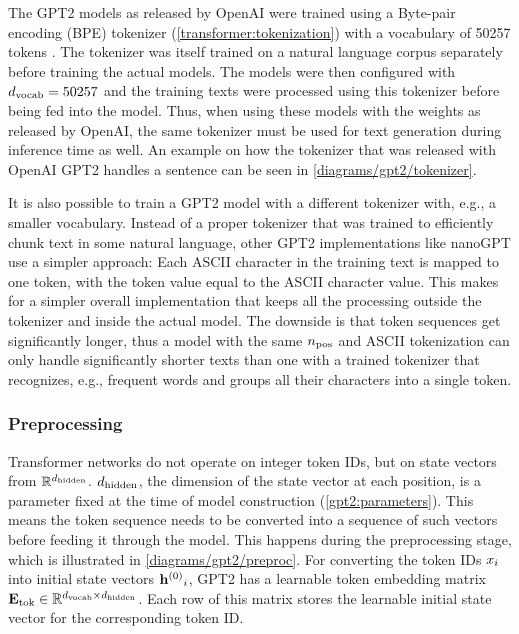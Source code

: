 \label{gpt2:tokenizer}

The GPT2 models as released by OpenAI were trained using a Byte-pair encoding (BPE) tokenizer (\cref{transformer:tokenization}) with a vocabulary of 50257 tokens  \cite{HuggingFaceGPT2}. The tokenizer was itself trained on a natural language corpus separately before training the actual models. The models were then configured with ${d_\textrm{vocab}}=50257$ and the training texts were processed using this tokenizer before being fed into the model. Thus, when using these models with the weights as released by OpenAI, the same tokenizer must be used for text generation during inference time as well. An example on how the tokenizer that was released with OpenAI GPT2 handles a sentence can be seen in \cref{diagrams/gpt2/tokenizer}.

It is also possible to train a GPT2 model with a different tokenizer with, e.g., a smaller vocabulary. Instead of a proper tokenizer that was trained to efficiently chunk text in some natural language, other GPT2 implementations like nanoGPT \cite{nanogpt} use a simpler approach: Each ASCII character in the training text is mapped to one token, with the token value equal to the ASCII character value.
This makes for a simpler overall implementation that keeps all the processing outside the tokenizer and inside the actual model.
The downside is that token sequences get significantly longer, thus a model with the same ${n_\textrm{pos}}$ and ASCII tokenization can only handle significantly shorter texts than one with a trained tokenizer that recognizes, e.g., frequent words and groups all their characters into a single token.



\subsubsection{Preprocessing}
\label{gpt2:preproc}

Transformer networks do not operate on integer token IDs, but on state vectors from $\mathbb{R}^{{d_\textrm{hidden}}}$. ${d_\textrm{hidden}}$, the dimension of the state vector at each position, is a parameter fixed at the time of model construction (\cref{gpt2:parameters}).
This means the token sequence needs to be converted into a sequence of such vectors before feeding it through the model. This happens during the preprocessing stage, which is illustrated in \cref{diagrams/gpt2/preproc}.
For converting the token IDs ${x}_i$ into initial state vectors ${{\mathbf{h}}^{(0)}}_i$, GPT2 has a learnable token embedding matrix ${\mathbf{E}_\textrm{tok}} \in \mathbb{R}^{{d_\textrm{vocab}} \times {d_\textrm{hidden}}}$. Each row of this matrix stores the learnable initial state vector for the corresponding token ID.


